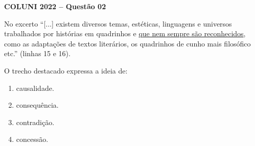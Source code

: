 \textbf{COLUNI 2022 -- Questão 02}\par\medskip No excerto “[...] existem diversos temas, estéticas, linguagens e universos trabalhados por histórias em quadrinhos e \underline{que nem sempre são reconhecidos}, como as adaptações de textos literários, os quadrinhos de cunho mais filosófico etc.” (linhas 15 e 16).

\par

O trecho destacado expressa a ideia de:


\begin{enumerate}
\item causalidade.
\item consequência.
\item contradição.
\item concessão.\end{enumerate}
